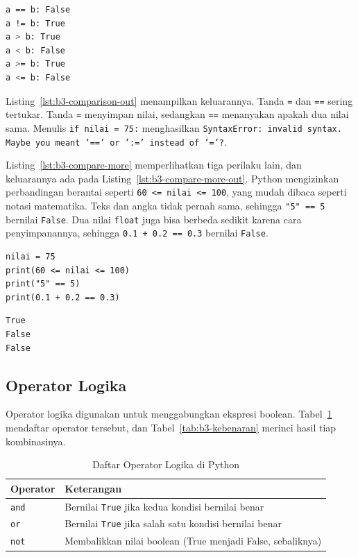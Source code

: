 \begin{lstlisting}[language=bash, caption={Keluaran comparison_operator.py}, label={lst:b3-comparison-out}]
a == b: False
a != b: True
a > b: True
a < b: False
a >= b: True
a <= b: False
\end{lstlisting}

Listing~\ref{lst:b3-comparison-out} menampilkan keluarannya. Tanda \texttt{=} dan \texttt{==} sering tertukar. Tanda \texttt{=} menyimpan nilai, sedangkan \texttt{==} menanyakan apakah dua nilai sama. Menulis \texttt{if nilai = 75:} menghasilkan \texttt{SyntaxError: invalid syntax. Maybe you meant '==' or ':=' instead of '='?}.

Listing~\ref{lst:b3-compare-more} memperlihatkan tiga perilaku lain, dan keluarannya ada pada Listing~\ref{lst:b3-compare-more-out}. Python mengizinkan perbandingan berantai seperti \texttt{60 <= nilai <= 100}, yang mudah dibaca seperti notasi matematika. Teks dan angka tidak pernah sama, sehingga \texttt{"5" == 5} bernilai \texttt{False}. Dua nilai \texttt{float} juga bisa berbeda sedikit karena cara penyimpanannya, sehingga \texttt{0.1 + 0.2 == 0.3} bernilai \texttt{False}.

\begin{lstlisting}[style=PythonStyle, caption={Kode Python: perbandingan_lain.py}, label={lst:b3-compare-more}]
nilai = 75
print(60 <= nilai <= 100)
print("5" == 5)
print(0.1 + 0.2 == 0.3)
\end{lstlisting}

\begin{lstlisting}[language=bash, caption={Keluaran perbandingan_lain.py}, label={lst:b3-compare-more-out}]
True
False
False
\end{lstlisting}


\subsection{Operator Logika}
Operator logika digunakan untuk menggabungkan ekspresi boolean. Tabel~\ref{tab:b3-logika} mendaftar operator tersebut, dan Tabel~\ref{tab:b3-kebenaran} merinci hasil tiap kombinasinya.

\begin{table}[H]
  \centering
  \caption{Daftar Operator Logika di Python}
  \label{tab:b3-logika}
  \begin{tabularx}{\textwidth}{lX}
    \hline
    \textbf{Operator} & \textbf{Keterangan} \\
    \hline
    \texttt{and} & Bernilai \texttt{True} jika kedua kondisi bernilai benar \\
    \hline
    \texttt{or} & Bernilai \texttt{True} jika salah satu kondisi bernilai benar \\
    \hline
    \texttt{not} & Membalikkan nilai boolean (True menjadi False, sebaliknya) \\
    \hline
  \end{tabularx}
\end{table}

